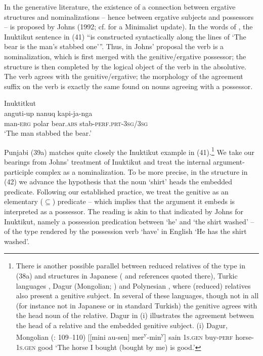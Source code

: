 \documentclass[output=paper]{langsci/langscibook}
\begin{document}
In the generative literature, the existence of a connection between ergative structures and nominalizations – hence between ergative subjects and possessors – is proposed by Johns (1992; cf. \citealt{Yuan2013} for a Minimalist update). In the words of \citet[61]{Johns1992}, the Inuktikut sentence in (41) “is constructed syntactically along the lines of ‘The bear is the man’s stabbed one’”. Thus, in Johns’ proposal the verb is a nominalization, which is first merged with the genitive/ergative possessor; the structure is then completed by the logical object of the verb in the absolutive. The verb agrees with the genitive/ergative; the morphology of the agreement suffix on the verb is exactly the same found on nouns agreeing with a possessor.

\ea%
         Inuktitkut \citep[61]{Johns1992}\label{ex:manzini:41}\\
    \gll anguti-up   nanuq     kapi-ja-nga\\
         man-\textsc{erg}   polar bear.\textsc{abs}  stab-\textsc{perf.prt-3sg/3sg}\\
    \glt ‘The man stabbed the bear.’
\z

Punjabi (39a) matches quite closely the Inuktikut example in (41).\footnote{There is another possible parallel between reduced relatives of the type in (38a) and structures in Japanese (\citealt{Miyagawa2011} and references quoted there), Turkic languages \citep{Kornfilt2008}, Dagur (Mongolian; \citealt{Hale2002}) and Polynesian \citep{HerdEtAl2011}, where (reduced) relatives also present a genitive subject. In several of these languages, though not in all (for instance not in Japanese or in standard Turkish) the genitive agrees with the head noun of the relative. Dagur in (i) illustrates the agreement between the head of a relative and the embedded genitive subject. (i)  Dagur, Mongolian (\citealt{Hale2002}: 109–110)   [[mini   au-sen]    mer\textsuperscript{y}{}-min\textsuperscript{y}]   sain  \textsc{1s.gen}  buy-\textsc{perf}  horse-\textsc{1s.gen}  good  ‘The horse I bought (bought by me) is good.’ }  We take our bearings from Johns’ treatment of Inuktikut and treat the internal argument-participle complex as a nominalization. To be more precise, in the structure in (42) we advance the hypothesis that the noun ‘shirt’ heads the embedded predicate. Following our established practice, we treat the genitive as an elementary ($\subseteq$) predicate – which implies that the argument it embeds is interpreted as a possessor. The reading is akin to that indicated by Johns for Inuktikut, namely a possession predication between ‘he’ and ‘the shirt washed’ – of the type rendered by the possession verb ‘have’ in English ‘He has the shirt washed’.  
\end{document}
